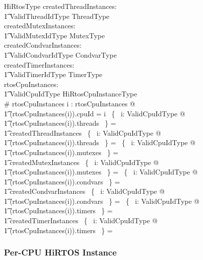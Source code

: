 \documentclass{AUJarticle}
\begin{document}
\begin{schema}{HiRtosType}
    createdThreadInstances: \\
    \t1 ValidThreadIdType \finj ThreadType \\
    createdMutexInstances: \\
    \t1 ValidMutexIdType \finj MutexType \\
    createdCondvarInstances: \\
    \t1 ValidCondvarIdType \finj CondvarType \\
    createdTimerInstances: \\
    \t1 ValidTimerIdType \finj TimerType \\
    rtosCpuInstances: \\
    \t1 ValidCpuIdType \finj HiRtosCpuInstanceType \\
\where
    \# rtosCpuInstances 
\also
    \forall i : \dom rtosCpuInstances @ \\
\t1   (rtosCpuInstances(i)).cpuId = i
\also
    \bigcup~\{~ i: ValidCpuIdType @ \\
\t1    (rtosCpuInstances(i)).threads ~\} = \\
\t1    createdThreadInstances
\also
    \bigcap~\{~ i: ValidCpuIdType @ \\
\t1    (rtosCpuInstances(i)).threads ~\} = \emptyset
\also
    \bigcup~\{~ i: ValidCpuIdType @ \\
\t1    (rtosCpuInstances(i)).mutexes ~\} = \\
\t1    createdMutexInstances
\also
    \bigcap~\{~ i: ValidCpuIdType @ \\
\t1    (rtosCpuInstances(i)).mutexes ~\} = \emptyset
\also
    \bigcup~\{~ i: ValidCpuIdType @ \\
\t1    (rtosCpuInstances(i)).condvars ~\} = \\
\t1    createdCondvarInstances
\also
    \bigcap~\{~ i: ValidCpuIdType @ \\
\t1    (rtosCpuInstances(i)).condvars ~\} = \emptyset
\also
    \bigcup~\{~ i: ValidCpuIdType @ \\
\t1    (rtosCpuInstances(i)).timers ~\} = \\
\t1    createdTimerInstances
\also
    \bigcap~\{~ i: ValidCpuIdType @ \\
\t1    (rtosCpuInstances(i)).timers ~\} = \emptyset
\end{schema}

\subsubsection{Per-CPU HiRTOS Instance}
\end{document}
